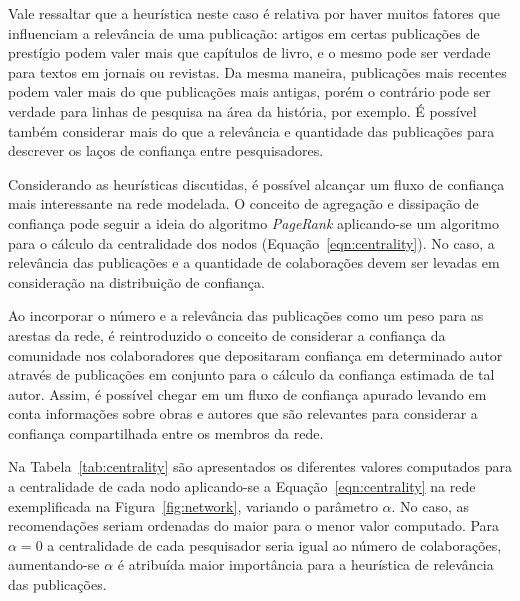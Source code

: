\documentclass[12pt]{article}
\begin{document}
Vale ressaltar que a heurística neste caso é relativa por haver muitos fatores que influenciam a relevância de uma publicação: artigos  em certas publicações de prestígio podem valer mais que capítulos de livro, e o mesmo pode ser verdade para textos em jornais ou revistas. Da mesma maneira, publicações mais recentes podem valer mais do que publicações mais antigas, porém o contrário pode ser verdade para linhas de pesquisa na área da história, por exemplo. É possível também considerar mais do que a relevância e quantidade das publicações para descrever os laços de confiança entre pesquisadores.

Considerando as heurísticas discutidas, é possível alcançar um fluxo de confiança mais interessante na rede modelada. O conceito de agregação e dissipação de confiança pode seguir a ideia do algoritmo \textit{PageRank} aplicando-se um algoritmo para o cálculo da centralidade dos nodos (Equação~\ref{eqn:centrality}). No caso, a relevância das publicações e a quantidade de colaborações devem ser levadas em consideração na distribuição de confiança.

Ao incorporar o número e a relevância das publicações como um peso para as arestas da rede, é reintroduzido o conceito de 
considerar a confiança da comunidade nos colaboradores que depositaram confiança em determinado autor através de publicações 
em  conjunto para o cálculo da confiança estimada de tal autor. Assim, é possível chegar em um fluxo de confiança apurado
levando em conta informações sobre obras e autores que são relevantes para considerar a confiança compartilhada entre 
os membros da rede.

Na Tabela~\ref{tab:centrality} são apresentados os diferentes valores computados para a centralidade de cada nodo aplicando-se a 
Equação~\ref{eqn:centrality} na rede exemplificada na Figura~\ref{fig:network}, variando o parâmetro $\alpha$. No caso, as 
recomendações seriam ordenadas do maior para o menor valor computado. Para $\alpha = 0$ a centralidade de cada pesquisador seria 
igual ao número de colaborações, aumentando-se $\alpha$ é atribuída maior importância para a heurística de relevância das 
publicações.

\end{document}
